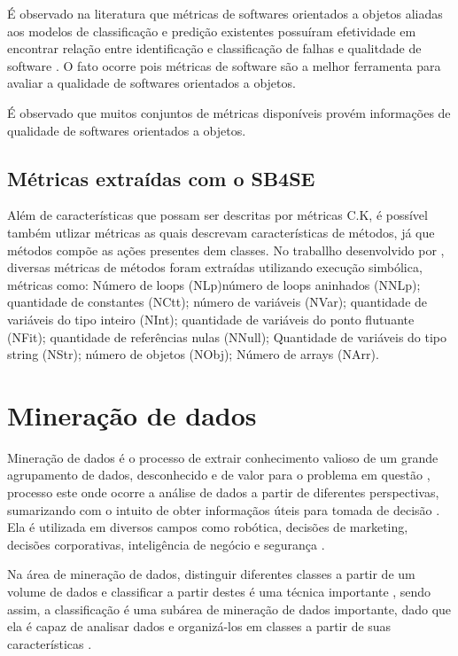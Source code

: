 \documentclass[
	12pt,				%
	oneside,			%
	a4paper,			%
	english,			%
	brazil				%
	]{abntex2ppgsi}
\begin{document}
É observado na literatura que métricas de softwares orientados a objetos aliadas aos modelos de classificação e predição existentes possuíram efetividade em encontrar relação entre identificação e classificação de falhas e qualitdade de software  \cite{Suresh2016}. O fato ocorre pois métricas de software são a melhor ferramenta para avaliar a qualidade de softwares orientados a objetos.  \cite{Suresh2016}

É observado que muitos conjuntos de métricas disponíveis provém informações de qualidade de softwares orientados a objetos.  \cite{Suresh2016}


\section{Métricas extraídas com o SB4SE}
Além de características que possam ser descritas por métricas C.K, é possível também utlizar métricas as quais descrevam características de métodos, já que métodos compõe as ações  presentes dem classes.  No traballho desenvolvido por \cite{Eler2016}, diversas métricas de métodos foram extraídas utilizando execução simbólica, métricas como: Número de loops (NLp)número de loops aninhados (NNLp); quantidade de constantes (NCtt); número de variáveis (NVar); quantidade de variáveis do tipo inteiro (NInt);  quantidade de variáveis do ponto flutuante (NFit); quantidade de referências nulas (NNull); Quantidade de variáveis do tipo string (NStr); número de objetos (NObj); Número de arrays (NArr).

\chapter{Mineração de dados}

Mineração de dados é o processo de extrair conhecimento valioso de um grande agrupamento de dados, desconhecido e de valor para o problema em questão \cite{Seth2016, sharma2015}, processo este onde ocorre a análise de dados a partir de diferentes perspectivas, sumarizando com o intuito de obter informaçãos úteis para tomada de decisão  \cite{ sharma2015}. Ela é utilizada em diversos campos como robótica, decisões de marketing, decisões corporativas, inteligência de negócio e segurança \cite{ Seth2016}.

Na área de mineração de dados, distinguir diferentes classes a partir de um volume de dados e classificar a partir destes é uma técnica importante \cite{Seth2016}, sendo assim, a classificação é uma subárea de mineração de dados importante, dado que ela é capaz de analisar dados e organizá-los em classes a partir de suas características \cite{ Seth2016}.
\end{document}
